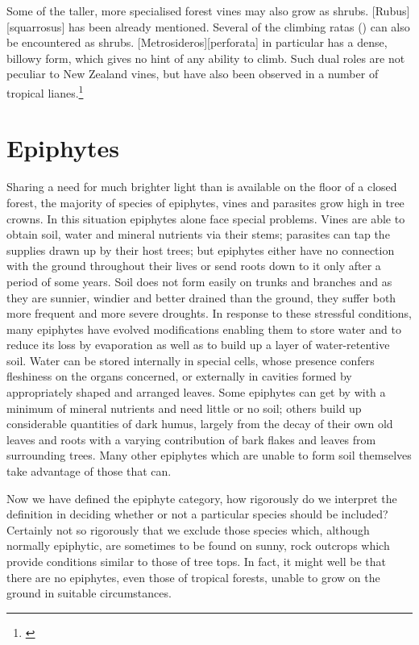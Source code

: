 Some of the taller, more specialised forest vines may also grow as shrubs. [Rubus][squarrosus] has been already mentioned.
Several of the climbing ratas () can also be encountered as shrubs. [Metrosideros][perforata] in particular has a dense, billowy form, which gives no hint of any ability to climb.
Such dual roles are not peculiar to New Zealand vines, but have also been observed in a number of tropical lianes.\footnote{\cite{richards1952tropical}}

\section{Epiphytes}

Sharing a need for much brighter light than is available on the floor of a closed forest, the majority of species of epiphytes, vines and parasites grow high in tree crowns.
In this situation epiphytes alone face special problems.
Vines are able to obtain soil, water and mineral nutrients via their stems; parasites can tap the supplies drawn up by their host trees; but epiphytes either have no connection with the ground throughout their lives or send roots down to it only after a period of some years.
Soil does not form easily on trunks and branches and as they are sunnier, windier and better drained than the ground, they suffer both more frequent and more severe droughts.
In response to these stressful conditions, many epiphytes have evolved modifications enabling them to store water and to reduce its loss by evaporation as well as to build up a layer of water-retentive soil.
Water can be stored internally in special cells, whose presence confers fleshiness on the organs concerned, or externally in cavities formed by appropriately shaped and arranged leaves.
Some epiphytes can get by with a minimum of mineral nutrients and need little or no soil; others build up considerable quantities of dark humus, largely from the decay of their own old leaves and roots with a varying contribution of bark flakes and leaves from surrounding trees.
Many other epiphytes which are unable to form soil themselves take advantage of those that can.

Now we have defined the epiphyte category, how rigorously do we interpret the definition in deciding whether or not a particular species should be included? Certainly not so rigorously that we exclude those species which, although normally epiphytic, are sometimes to be found on sunny, rock outcrops which provide conditions similar to those of tree tops.
In fact, it might well be that there are no epiphytes, even those of tropical forests, unable to grow on the ground in suitable circumstances.

